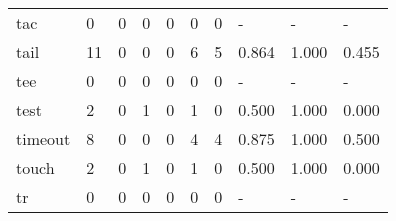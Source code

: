 \begin{longtable}{lp{1.3cm}p{1.3cm}p{1.3cm}p{1.3cm}p{1.3cm}p{1.3cm}p{1.3cm}p{1.3cm}p{1.3cm}}
tac       &                      0 &                                             0 &                                            0 &                                           0 &                                            0 &                                          0 &                                    - &                                      - &                                    - \\
tail      &                     11 &                                             0 &                                            0 &                                           0 &                                            6 &                                          5 &                                0.864 &                                  1.000 &                                0.455 \\
tee       &                      0 &                                             0 &                                            0 &                                           0 &                                            0 &                                          0 &                                    - &                                      - &                                    - \\
test      &                      2 &                                             0 &                                            1 &                                           0 &                                            1 &                                          0 &                                0.500 &                                  1.000 &                                0.000 \\
timeout   &                      8 &                                             0 &                                            0 &                                           0 &                                            4 &                                          4 &                                0.875 &                                  1.000 &                                0.500 \\
touch     &                      2 &                                             0 &                                            1 &                                           0 &                                            1 &                                          0 &                                0.500 &                                  1.000 &                                0.000 \\
tr        &                      0 &                                             0 &                                            0 &                                           0 &                                            0 &                                          0 &                                    - &                                      - &                                    - \\

\end{longtable}
